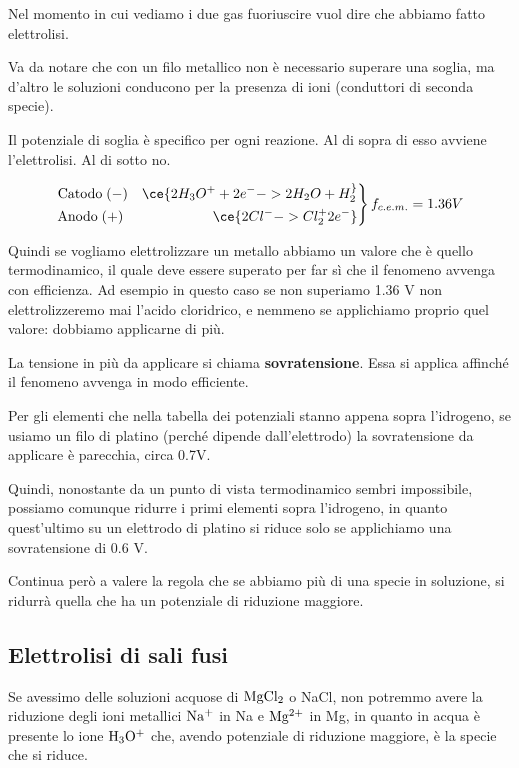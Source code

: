 Nel momento in cui vediamo i due gas fuoriuscire vuol dire che abbiamo fatto elettrolisi.

Va da notare che con un filo metallico non è necessario superare una soglia, ma d'altro le soluzioni conducono per la presenza di ioni (conduttori di seconda specie).

Il potenziale di soglia è specifico per ogni reazione. Al di sopra di esso avviene l'elettrolisi. Al di sotto no.

\begin{equation*}
    \left.\begin{aligned}
    \text{Catodo} \; (-) \quad \ce{2H_3O^+ + 2e^- -> 2H_2O + H_2 ^}\\
    \text{Anodo} \; (+) \hspace{1.9cm} \quad \ce{2Cl^- -> Cl_2 ^ + 2 e^-}
  \end{aligned}\right\} f_{c.e.m.}=1.36 V
\end{equation*}

Quindi se vogliamo elettrolizzare un metallo abbiamo un valore che è quello termodinamico, il quale deve essere superato per far sì che il fenomeno avvenga con efficienza. Ad esempio in questo caso se non superiamo 1.36 V non elettrolizzeremo mai l'acido cloridrico, e nemmeno se applichiamo proprio quel valore: dobbiamo applicarne di più. 

La tensione in più da applicare si chiama \textbf{sovratensione}. Essa si applica affinché il fenomeno avvenga in modo efficiente.

Per gli elementi che nella tabella dei potenziali stanno appena sopra l'idrogeno, se usiamo un filo di platino (perché dipende dall'elettrodo) la sovratensione da applicare è parecchia, circa 0.7V.

Quindi, nonostante da un punto di vista termodinamico sembri impossibile, possiamo comunque ridurre i primi elementi sopra l'idrogeno, in quanto quest'ultimo su un elettrodo di platino si riduce solo se applichiamo una sovratensione di 0.6 V.

Continua però a valere la regola che se abbiamo più di una specie in soluzione, si ridurrà quella che ha un potenziale di riduzione maggiore.

\subsection{Elettrolisi di sali fusi}

Se avessimo delle soluzioni acquose di $\rm MgCl_2$ o NaCl, non potremmo avere la riduzione degli ioni metallici $\rm Na^+$ in Na e $\rm Mg^{2+}$ in Mg, in quanto in acqua è presente lo ione $\rm H_3O^+$ che, avendo potenziale di riduzione maggiore, è la specie che si riduce.


